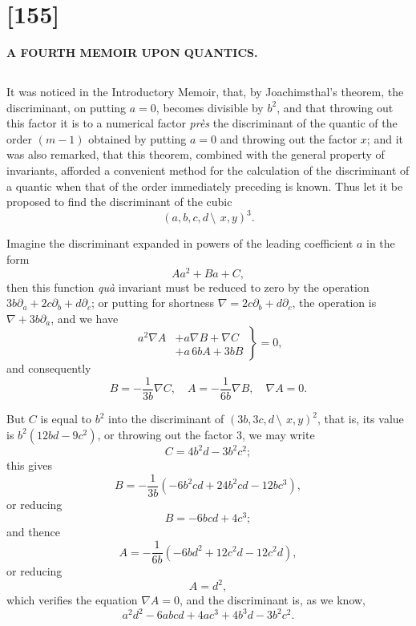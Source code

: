 \documentclass[12pt,a4paper]{article}
\begin{document}

\section*{[155]}

\begin{center}
\Large\textbf{A FOURTH MEMOIR UPON QUANTICS.}
\end{center}

\setcounter{subsection}{80}

\subsection{}

It was noticed in the Introductory Memoir, that, by Joachimsthal's theorem, the discriminant, on putting $a = 0$, becomes divisible by $b^2$, and that throwing out this factor it is to a numerical factor \textit{pr\`es} the discriminant of the quantic of the order $(m-1)$ obtained by putting $a = 0$ and throwing out the factor $x$; and it was also remarked, that this theorem, combined with the general property of invariants, afforded a convenient method for the calculation of the discriminant of a quantic when that of the order immediately preceding is known. Thus let it be proposed to find the discriminant of the cubic
\[
(a, b, c, d\,\setminus\!\!\:\, x, y)^3.
\]

Imagine the discriminant expanded in powers of the leading coefficient $a$ in the form
\[
Aa^2 + Ba + C,
\]
then this function \textit{qu\`a} invariant must be reduced to zero by the operation $3b\partial_a + 2c\partial_b + d\partial_c$; or putting for shortness $\nabla = 2c\partial_b + d\partial_c$, the operation is $\nabla + 3b\partial_a$, and we have
\[
\left.\begin{aligned}
a^2 \nabla A &+ a\nabla B + \nabla C\\
&+ a\, 6bA + 3bB
\end{aligned}\right\} = 0,
\]
and consequently
\[
B = -\frac{1}{3b}\nabla C, \quad A = -\frac{1}{6b}\nabla B, \quad \nabla A = 0.
\]

But $C$ is equal to $b^2$ into the discriminant of $(3b, 3c, d\,\setminus\!\!\:\, x, y)^2$, that is, its value is $b^2(12bd - 9c^2)$, or throwing out the factor $3$, we may write
\[
C = 4b^2d - 3b^2c^2;
\]
this gives
\[
B = -\frac{1}{3b}(-6b^2cd + 24b^2cd - 12bc^3),
\]
or reducing
\[
B = -6bcd + 4c^3;
\]
and thence
\[
A = -\frac{1}{6b}(-6bd^2 + 12c^2d - 12c^2d),
\]
or reducing
\[
A = d^2,
\]
which verifies the equation $\nabla A = 0$, and the discriminant is, as we know,
\[
a^2d^2 - 6abcd + 4ac^3 + 4b^3d - 3b^2c^2.
\]
\end{document}
